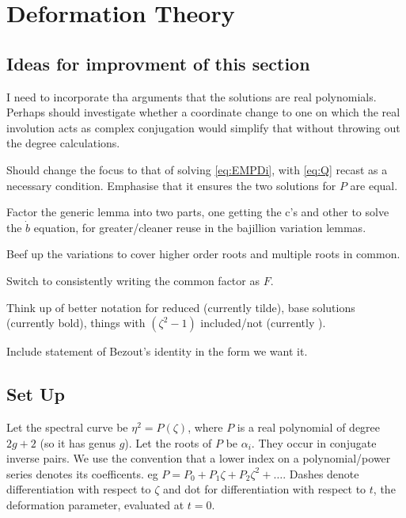 \section{Deformation Theory}
\label{sec:Deformation Theory}

\subsection{Ideas for improvment of this section}
\label{sec:Ideas for improvment}
I need to incorporate tha arguments that the solutions are real polynomials. Perhaps should investigate whether a coordinate change to one on which the real involution acts as complex conjugation would simplify that without throwing out the degree calculations.

Should change the focus to that of solving \eqref{eq:EMPDi}, with \eqref{eq:Q} recast as a necessary condition. Emphasise that it ensures the two solutions for $P$ are equal.

Factor the generic lemma into two parts, one getting the c's and other to solve the $\dot b$ equation, for greater/cleaner reuse in the bajillion variation lemmas.

Beef up the variations to cover higher order roots and multiple roots in common.

Switch to consistently writing the common factor as $F$.

Think up of better notation for reduced (currently tilde), base solutions (currently bold), things with $(ζ^2-1)$ included/not (currently ).

Include statement of Bezout's identity in the form we want it.

\subsection{Set Up} %
Let the spectral curve be $\eta^2 = P(\zeta)$, where $P$ is a real polynomial of degree $2g+2$ (so it has genus $g$). Let the roots of $P$ be $\alpha_i$. They occur in conjugate inverse pairs. We use the convention that a lower index on a polynomial/power series denotes its coefficents. eg $P = P_0 + P_1\zeta + P_2\zeta^2 + \dots$. Dashes denote differentiation with respect to $\zeta$ and dot for differentiation with respect to $t$, the deformation parameter, evaluated at $t=0$.

